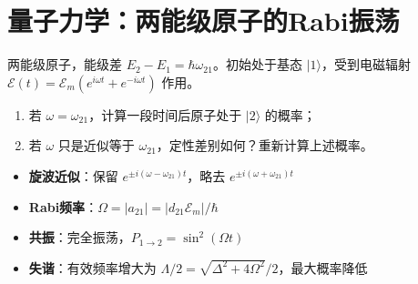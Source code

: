 \section{量子力学：两能级原子的Rabi振荡}
\label{sec:rabi-oscillation}

\begin{modelbox}[题目：两能级原子的Rabi振荡]
两能级原子，能级差 $E_2-E_1=\hbar\omega_{21}$。初始处于基态 $|1\rangle$，受到电磁辐射 $\mathcal{E}(t)=\mathcal{E}_m(e^{i\omega t}+e^{-i\omega t})$ 作用。
\begin{enumerate}
    \item 若 $\omega=\omega_{21}$，计算一段时间后原子处于 $|2\rangle$ 的概率；
    \item 若 $\omega$ 只是近似等于 $\omega_{21}$，定性差别如何？重新计算上述概率。
\end{enumerate}
\end{modelbox}

\begin{tipbox}[考点快速分析]
\begin{itemize}
    \item \textbf{旋波近似}：保留 $e^{\pm i(\omega-\omega_{21})t}$，略去 $e^{\pm i(\omega+\omega_{21})t}$
    \item \textbf{Rabi频率}：$\Omega=|a_{21}|=|d_{21}\mathcal{E}_m|/\hbar$
    \item \textbf{共振}：完全振荡，$P_{1\to2}=\sin^2(\Omega t)$
    \item \textbf{失谐}：有效频率增大为 $\Lambda/2=\sqrt{\Delta^2+4\Omega^2}/2$，最大概率降低
\end{itemize}
\end{tipbox}

